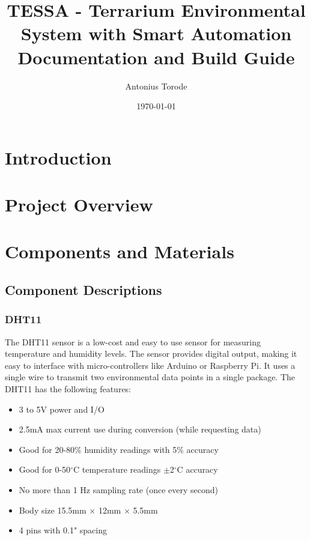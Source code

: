 \documentclass{article}
\title{TESSA - Terrarium Environmental System with Smart Automation\\
	Documentation and Build Guide}
\author{Antonius Torode}
\date{\today}
\begin{document}
	
	\maketitle
	
	\tableofcontents
	
	\listoffigures %
	\listoftables %
	
	\begin{abstract}
		\lipsum[1]
	\end{abstract}
	
	\begin{multicols}{2} %
		
		\section{Introduction}
		\lipsum[2-4]
		
		\section{Project Overview}
		\lipsum[5-7]
		
		\section{Components and Materials}
		\lipsum[8-10]
		
		\subsection{Component Descriptions}
			
			\subsubsection{DHT11}
			
			The DHT11 sensor is a low-cost and easy to use sensor for measuring temperature and humidity levels. The sensor provides digital output, making it easy to interface with micro-controllers like Arduino or Raspberry Pi. It uses a single wire to transmit two environmental data points in a single package. The DHT11 has the following features:			
			\begin{itemize}[itemsep=1pt, parsep=1pt]
				\item 3 to 5V power and I/O
				\item 2.5mA max current use during conversion (while requesting data)
				\item Good for 20-80\% humidity readings with 5\% accuracy
				\item Good for 0-50$^\circ$C temperature readings $\pm$2$^\circ$C accuracy
				\item No more than 1 Hz sampling rate (once every second)
				\item Body size 15.5mm $\times$ 12mm $\times$ 5.5mm
				\item 4 pins with 0.1" spacing
			\end{itemize}			
			

\end{multicols}
\end{document}
